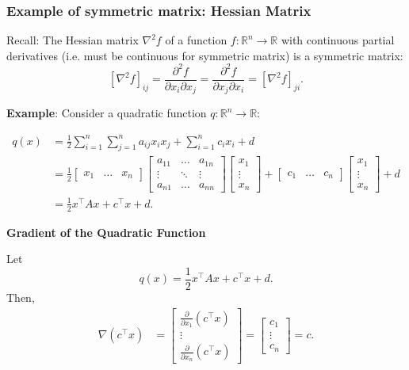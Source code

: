 \subsubsection{Example of symmetric matrix: Hessian Matrix}
\begin{example}
    Recall: The Hessian matrix \(\nabla^2 f\) of a function \( f: \mathbb{R}^n \to \mathbb{R} \) with continuous partial derivatives (i.e. must be continuous for symmetric matrix) is a symmetric matrix:
    \[
    [\nabla^2 f]_{ij} = \frac{\partial^2 f}{\partial x_i \partial x_j} = \frac{\partial^2 f}{\partial x_j \partial x_i} = [\nabla^2 f]_{ji}.
    \]

    \textbf{Example}: Consider a quadratic function \( q: \mathbb{R}^n \to \mathbb{R} \):

    \begin{align*}
        q(x) &= \frac{1}{2} \sum_{i=1}^n \sum_{j=1}^n a_{ij} x_i x_j + \sum_{i=1}^n c_i x_i + d \\
    &= \frac{1}{2} 
    \begin{bmatrix}
    x_1 & \dots & x_n
    \end{bmatrix}
    \begin{bmatrix}
    a_{11} & \dots & a_{1n} \\
    \vdots & \ddots & \vdots \\
    a_{n1} & \dots & a_{nn}
    \end{bmatrix}
    \begin{bmatrix}
    x_1 \\
    \vdots \\
    x_n
    \end{bmatrix}
    + 
    \begin{bmatrix}
    c_1 & \dots & c_n
    \end{bmatrix}
    \begin{bmatrix}
    x_1 \\
    \vdots \\
    x_n
    \end{bmatrix}
    + d \\
    &= \frac{1}{2} x^\top A x + c^\top x + d.
    \end{align*}

    \vspace{1em}

    \textbf{Gradient of the Quadratic Function}

    Let 
    \[
    q(x) = \frac{1}{2} x^\top A x + c^\top x + d.
    \]
    Then,
    \begin{align*}
    \nabla(c^\top x) &= \begin{bmatrix}
    \frac{\partial}{\partial x_1} (c^\top x) \\
    \vdots \\
    \frac{\partial}{\partial x_n} (c^\top x)
    \end{bmatrix} 
    = \begin{bmatrix}
    c_1 \\
    \vdots \\
    c_n
    \end{bmatrix}
    = c.
    \end{align*}


\end{example}
